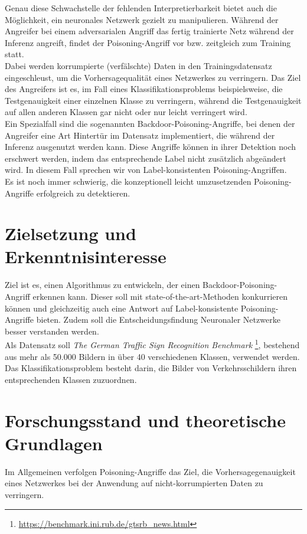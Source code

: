 \documentclass{article}
\theoremstyle{break}
\begin{document}
\noindent Genau diese Schwachstelle der fehlenden Interpretierbarkeit bietet auch die Möglichkeit, ein neuronales Netzwerk gezielt zu manipulieren.  
Während der Angreifer bei einem adversarialen Angriff das fertig trainierte Netz während der Inferenz angreift, findet der Poisoning-Angriff vor bzw. zeitgleich zum Training statt.\\
Dabei werden korrumpierte (verfälschte) Daten in den Trainingsdatensatz eingeschleust, um die Vorhersagequalität eines Netzwerkes zu verringern.
Das Ziel des Angreifers ist es, im Fall eines Klassifikationsproblems beispielsweise, die Testgenauigkeit einer einzelnen Klasse zu verringern, während die Testgenauigkeit auf allen anderen Klassen gar nicht oder nur leicht verringert wird.\\
Ein Spezialfall sind die sogenannten Backdoor-Poisoning-Angriffe, bei denen der Angreifer eine Art Hintertür im Datensatz implementiert, die während der Inferenz ausgenutzt werden kann.
Diese Angriffe können in ihrer Detektion noch erschwert werden, indem das entsprechende Label nicht zusätzlich abgeändert wird. In diesem Fall sprechen wir von Label-konsistenten Poisoning-Angriffen. \\



\noindent Es ist noch immer schwierig, die konzeptionell leicht umzusetzenden Poisoning-Angriffe erfolgreich zu detektieren.

\section{Zielsetzung und Erkenntnisinteresse}
Ziel ist es, einen Algorithmus zu entwickeln, der einen Backdoor-Poisoning-Angriff erkennen kann. Dieser soll mit state-of-the-art-Methoden konkurrieren können und gleichzeitig auch eine Antwort auf Label-konsistente Poisoning-Angriffe bieten. Zudem soll die Entscheidungsfindung Neuronaler Netzwerke besser verstanden werden.\\

\noindent Als Datensatz soll \textit{The German Traffic Sign Recognition Benchmark} \footnote{\url{https://benchmark.ini.rub.de/gtsrb\_news.html}}, bestehend aus mehr als 50.000 Bildern in über 40 verschiedenen Klassen, verwendet werden. Das Klassifikationsproblem besteht darin, die Bilder von Verkehrsschildern ihren entsprechenden Klassen zuzuordnen.

\section{Forschungsstand und theoretische Grundlagen}
Im Allgemeinen verfolgen Poisoning-Angriffe das Ziel, die Vorhersagegenauigkeit eines Netzwerkes bei der Anwendung auf nicht-korrumpierten Daten zu verringern.
\end{document}
